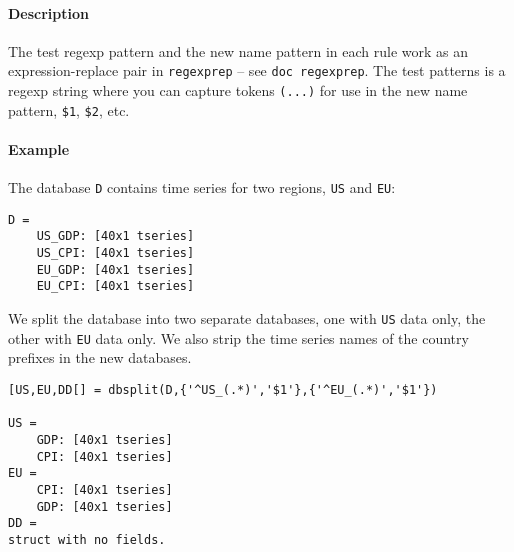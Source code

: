 \paragraph{Description}\label{description}

The test regexp pattern and the new name pattern in each rule work as an
expression-replace pair in \texttt{regexprep} -- see
\texttt{doc regexprep}. The test patterns is a regexp string where you
can capture tokens \texttt{(...)} for use in the new name pattern,
\texttt{\$1}, \texttt{\$2}, etc.

\paragraph{Example}\label{example}

The database \texttt{D} contains time series for two regions,
\texttt{US} and \texttt{EU}:

\begin{verbatim}
D = 
    US_GDP: [40x1 tseries]
    US_CPI: [40x1 tseries]
    EU_GDP: [40x1 tseries]
    EU_CPI: [40x1 tseries]
\end{verbatim}

We split the database into two separate databases, one with \texttt{US}
data only, the other with \texttt{EU} data only. We also strip the time
series names of the country prefixes in the new databases.

\begin{verbatim}
[US,EU,DD[] = dbsplit(D,{'^US_(.*)','$1'},{'^EU_(.*)','$1'})

US = 
    GDP: [40x1 tseries]
    CPI: [40x1 tseries]
EU = 
    CPI: [40x1 tseries]
    GDP: [40x1 tseries]
DD = 
struct with no fields.
\end{verbatim}


